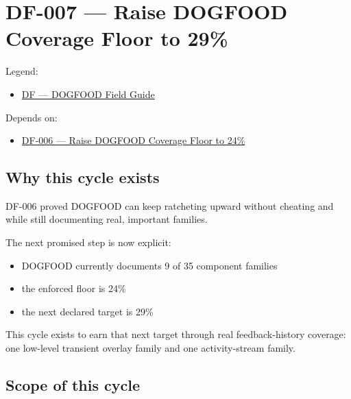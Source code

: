 \chapter{DF-007 --- Raise DOGFOOD Coverage Floor to 29\%}\label{record-069}

\smallskip

Legend:

\begin{itemize}
\tightlist
\item
  \href{https://github.com/flyingrobots/bijou/blob/1853ad902f6bf219326409e7f743a5a1d6517dbc/docs/legends/DF-dogfood-field-guide.md}{DF --- DOGFOOD Field Guide}
\end{itemize}

Depends on:

\begin{itemize}
\tightlist
\item
  \href{https://github.com/flyingrobots/bijou/blob/cbd70612140e7a450d764b3c7be1c6af878b99bc/docs/design/DF-006-raise-dogfood-coverage-floor-to-24-percent.md}{DF-006 --- Raise DOGFOOD Coverage Floor to 24\%}
\end{itemize}

\section{Why this cycle exists}\label{record-069-why-this-cycle-exists}

DF-006 proved DOGFOOD can keep ratcheting upward without cheating and while still documenting real, important families.

The next promised step is now explicit:

\begin{itemize}
\tightlist
\item
  DOGFOOD currently documents 9 of 35 component families
\item
  the enforced floor is 24\%
\item
  the next declared target is 29\%
\end{itemize}

This cycle exists to earn that next target through real feedback-history coverage: one low-level transient overlay family and one activity-stream family.

\section{Scope of this cycle}\label{record-069-scope-of-this-cycle}


